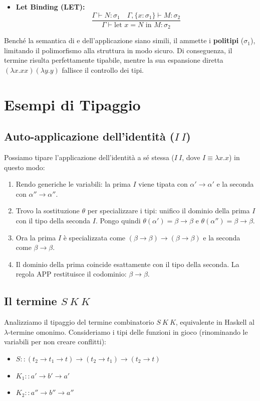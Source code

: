 \begin{itemize}
    \item \textbf{Let Binding (LET):} 
    $$ \frac{\Gamma\vdash N:\sigma_1 \quad \Gamma,\{x:\sigma_1\}\vdash M:\sigma_2}{\Gamma\vdash \text{let } x=N \text{ in } M:\sigma_2} $$
\end{itemize}

Benché la semantica di  e dell'applicazione siano simili, il  ammette i \textbf{politipi} ($\sigma_1$), limitando il polimorfismo alla struttura in modo sicuro. 
Di conseguenza, il termine  risulta perfettamente tipabile, mentre la sua espansione diretta $(\lambda x.xx)(\lambda y.y)$ fallisce il controllo dei tipi. 

\section{Esempi di Tipaggio}

\subsection{Auto-applicazione dell'identità ($I \ I$)}
Possiamo tipare l'applicazione dell'identità a sé stessa ($I \ I$, dove $I \equiv \lambda x.x$) in questo modo: 
\begin{enumerate}
    \item Rendo generiche le variabili: la prima $I$ viene tipata con $\alpha'\rightarrow\alpha'$ e la seconda con $\alpha''\rightarrow\alpha''$. 
    \item Trovo la sostituzione $\theta$ per specializzare i tipi: unifico il dominio della prima $I$ con il tipo della seconda $I$. Pongo quindi $\theta(\alpha') = \beta\rightarrow\beta$ e $\theta(\alpha'') = \beta\rightarrow\beta$. 
    \item Ora la prima $I$ è specializzata come $(\beta\rightarrow\beta)\rightarrow(\beta\rightarrow\beta)$ e la seconda come $\beta\rightarrow\beta$. 
    \item Il dominio della prima coincide esattamente con il tipo della seconda. La regola APP restituisce il codominio: $\beta\rightarrow\beta$. 
\end{enumerate}

\subsection{Il termine $S \ K \ K$}
Analizziamo il tipaggio del termine combinatorio $S \ K \ K$, equivalente in Haskell al $\lambda$-termine omonimo. 
Consideriamo i tipi delle funzioni in gioco (rinominando le variabili per non creare conflitti): 
\begin{itemize}
    \item $S :: (t_2 \rightarrow t_1 \rightarrow t) \rightarrow (t_2 \rightarrow t_1) \rightarrow (t_2 \rightarrow t)$ 
    \item $K_1 :: a' \rightarrow b' \rightarrow a'$ 
    \item $K_2 :: a'' \rightarrow b'' \rightarrow a''$ 
\end{itemize}

